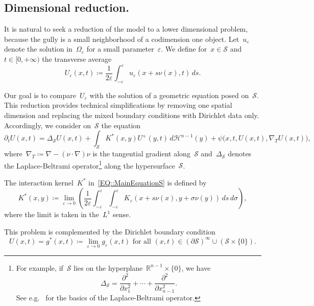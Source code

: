 \documentclass[12pt,a4paper]{amsart}
\numberwithin{equation}{section}
\theoremstyle{definition}
\theoremstyle{remark}
\newcommand{\R}{\mathbb{R}}
\newcommand{\eps}{\varepsilon}
\begin{document}
\subsection{Dimensional reduction.}
It is natural to seek a reduction of the model to a lower dimensional problem, because the gully is a small neighborhood of a codimension one object. Let~$u_\eps$ denote the solution in~$\Omega_\eps$ for a small parameter~$\eps$. We define for~$x\in\mathcal{S}$ and~$t \in [0,+\infty)$ the transverse average %
\begin{equation}\label{EQ::UaverageDefinition}
    U_\eps(x,t) \coloneq \frac{1}{2\eps}\int_{-\eps}^\eps u_\eps(x+s\nu(x),t)\,ds.
\end{equation}

Our goal is to compare~$U_\eps$ with the solution of a geometric equation posed on~$\mathcal{S}$. This reduction provides technical simplifications by removing one spatial dimension and replacing the mixed boundary conditions with Dirichlet data only. Accordingly, we consider on~$\mathcal{S}$ the equation
\begin{equation}\label{EQ::MainEquationS}
    \partial_t U(x,t) = \Delta_{\mathcal{S}}U(x,t) + \int_{\mathcal{S}} K^\ast(x,y)U^+(y,t)\,d\mathcal{H}^{n-1}(y) + \psi\big(x,t,U(x,t),\nabla_T U(x,t)\big),
\end{equation}
where~$\nabla_T \coloneq \nabla - (\nu \cdot \nabla)\nu$ is the tangential gradient along~$\mathcal{S}$ and~$\Delta_{\mathcal{S}}$ denotes the Laplace-Beltrami operator\footnote{For example,
if~$\mathcal{S}$ lies on the hyperplane~$\R^{n-1}\times\{0\}$, we have
\[\Delta_\mathcal{S}=\frac{\partial^2}{\partial x_1^2}+\cdots+\frac{\partial^2}{\partial x_{n-1}^2}.\]
See e.g.~\cite{MR4784613} for the basics of the Laplace-Beltrami operator.} along the hypersurface~$\mathcal{S}$.

The interaction kernel~$K^\ast$ in~\eqref{EQ::MainEquationS} is defined by
\begin{equation}\label{EQ::KastDefinition}
    K^\ast(x,y) \coloneq \lim_{\eps \to 0} \left(\frac{1}{2\eps} \int_{-\eps}^\eps\int_{-\eps}^\eps K_\eps(x+s\nu(x), y+\sigma\nu(y))\,ds\,d\sigma\right),
\end{equation}
where the limit is taken in the~$L^1$ sense.

This problem is complemented by the Dirichlet boundary condition
\begin{equation}\label{EQ::MainDirichletS}
    U(x,t) = g^\ast(x,t)\coloneq \lim_{\eps \to 0}g_\eps(x,t) \text{ for all } (x,t) \in {(\partial\mathcal{S})}^\infty \cup \left(\mathcal{S} \times \{0\}\right). %
\end{equation}
\end{document}
